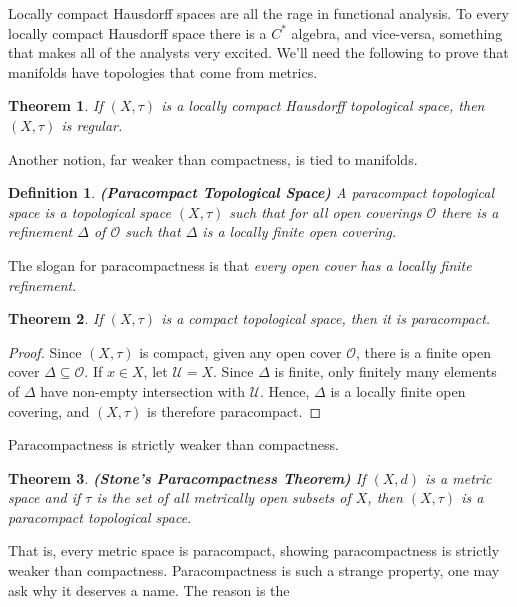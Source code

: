 \documentclass{article}
\theoremstyle{plain}
\newtheorem{theorem}{Theorem}[section]
\theoremstyle{normal}
\newtheorem{definition}{Definition}[section]
\begin{document}
        Locally compact Hausdorff spaces are all the rage in functional
        analysis. To every locally compact Hausdorff space there is a
        $C^{*}$ algebra, and vice-versa, something that makes all of the
        analysts very excited. We'll need the following to prove that manifolds
        have topologies that come from metrics.
        \begin{theorem}
            If $(X,\tau)$ is a locally compact Hausdorff topological space,
            then $(X,\tau)$ is regular.
        \end{theorem}
        Another notion, far weaker than compactness, is tied to manifolds.
        \begin{definition}{\textbf{(Paracompact Topological Space)}}
            A paracompact topological space is a topological space $(X,\tau)$
            such that for all open coverings $\mathcal{O}$ there is a refinement
            $\Delta$ of $\mathcal{O}$ such that $\Delta$ is a locally finite
            open covering.
        \end{definition}
        The slogan for paracompactness is that
        \textit{every open cover has a locally finite refinement}.
        \begin{theorem}
            If $(X,\tau)$ is a compact topological space,
            then it is paracompact.
        \end{theorem}
        \begin{proof}
            Since $(X,\tau)$ is compact, given any open cover $\mathcal{O}$,
            there is a finite open cover $\Delta\subseteq\mathcal{O}$. If
            $x\in{X}$, let $\mathcal{U}=X$. Since $\Delta$ is finite, only
            finitely many elements of $\Delta$ have non-empty intersection with
            $\mathcal{U}$. Hence, $\Delta$ is a locally finite open covering,
            and $(X,\tau)$ is therefore paracompact.
        \end{proof}
        Paracompactness is strictly weaker than compactness.
        \begin{theorem}{\textbf{(Stone's Paracompactness Theorem)}}
            If $(X,d)$ is a metric space and if $\tau$ is the set of all
            metrically open subsets of $X$, then $(X,\tau)$ is a paracompact
            topological space.
        \end{theorem}
        That is, every metric space is paracompact, showing paracompactness is
        strictly weaker than compactness. Paracompactness is such a strange
        property, one may ask why it deserves a name. The reason is the
\end{document}
